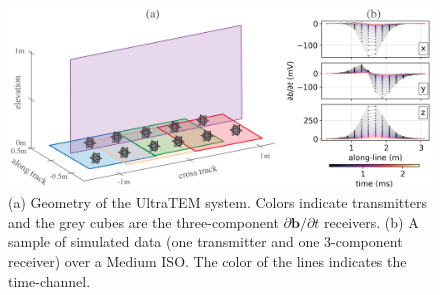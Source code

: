 \begin{figure}[htb]
    \begin{center}
    \includegraphics[width=\columnwidth]{figures/ultratem-04.png}
    \end{center}
\caption{
    (a) Geometry of the UltraTEM system. Colors indicate transmitters
    and the grey cubes are the three-component $\partial \mathbf{b}/\partial t$ receivers.
    (b) A sample of simulated data (one transmitter and one 3-component receiver) over a Medium ISO. The color of the lines indicates the time-channel.
}
\label{fig:ultratem}
\end{figure}

